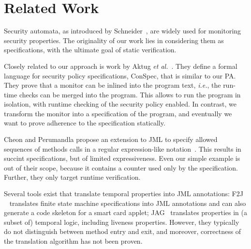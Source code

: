 \section{Related Work}\label{SecRelated}

Security automata, as introduced by Schneider~\cite{Schneider99}, are
widely used for monitoring security properties. The originality of our
work lies in considering them as specifications, with the ultimate
goal of static verification.

Closely related to our approach is work by Aktug \emph{et
al.}~\cite{Aktug07,AktugDG08}. They define a formal language for
security policy specifications, ConSpec, that is similar to our
PA. They prove that a monitor can be inlined into the program text,
\emph{i.e.}, the run-time checks can be merged into the program. This
allows to run the program in isolation, with runtime checking of the
security policy enabled. In contrast, we transform the monitor into a
specification of the program, and eventually we want to prove
adherence to the specification statically.

Cheon and Perumandla propose an extension to JML to specify allowed
sequences of methods calls in a regular expression-like
notation~\cite{Cheon07}.  This results in succint specifications, but
of limited expressiveness. Even our simple example is out of their
scope, because it contains a counter used only by the
specification. Further, they only target runtime verification.

Several tools exist that translate temporal properties into JML
annotations: F2J ~\cite{Hubbers03} translates finite state machine
specifications into JML annotations and can also generate a code
skeleton for a smart card applet; JAG~\cite{Giorgetti06} translates
properties in (a subset of) temporal logic, including liveness
properties.  However, they typically do not distinguish between method
entry and exit, and moreover, correctness of the translation algorithm
has not been proven.


